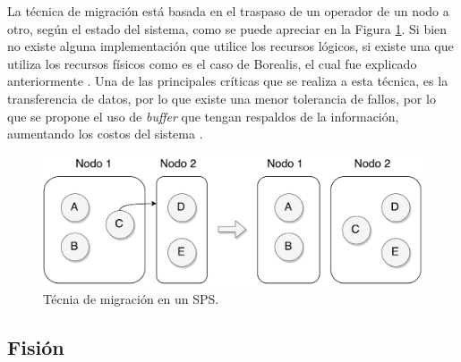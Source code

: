 La técnica de migración está basada en el traspaso de un operador de un nodo a otro, según el estado del sistema, como se puede apreciar en la Figura \ref{fig:migracion}. Si bien no existe alguna implementación que utilice los recursos lógicos, si existe una que utiliza los recursos físicos como es el caso de Borealis, el cual fue explicado anteriormente \citep{XingZH05}. Una de las principales críticas que se realiza a esta técnica, es la transferencia de datos, por lo que existe una menor tolerancia de fallos, por lo que se propone el uso de \textit{buffer} que tengan respaldos de la información, aumentando los costos del sistema \citep{PittauACA07}.

\begin{figure}[!ht]
	\centering
	\includegraphics[scale=0.45]{images/Migracion.pdf}
	\caption{Técnia de migración en un SPS.}
	\label{fig:migracion}
\end{figure}

\subsection{Fisión}
\label{sec:fisionBC}



